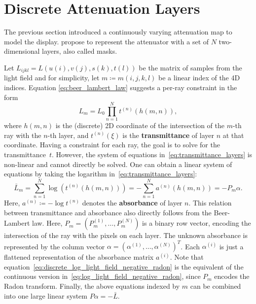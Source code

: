 \section{Discrete Attenuation Layers}

The previous section introduced a continuously varying attenuation map to model the display.
\cite{WetzsteinTomo} propose to represent the attenuator with a set of $N$ two-dimensional layers, also called masks.

Let $L_{ijkl} = L(u(i), v(j), s(k), t(l))$ be the matrix of samples from the light field and for simplicity, let $m \coloneqq m(i, j, k, l)$ be a linear index of the 4D indices.
Equation \ref{eq:beer_lambert_law} suggests a per-ray constraint in the form
\begin{equation}\label{eq:transmittance_layers}
	L_m = L_0 \prod_{n=1}^{N} t^{(n)} (h(m, n)), 
\end{equation}
where $h(m, n)$ is the (discrete) 2D coordinate of the intersection of the \mbox{$m$-th} ray with the \mbox{$n$-th} layer, and $t^{(n)}(\xi)$ is the \textbf{transmittance} of layer $n$ at that coordinate.
Having a constraint for each ray, the goal is to solve for the transmittance~$t$.
However, the system of equations in~\ref{eq:transmittance_layers} is non-linear and cannot directly be solved.
One can obtain a linear system of equations by taking the logarithm in~\ref{eq:transmittance_layers}:
\begin{equation}\label{eq:discrete_log_light_field_negative_radon}
	\bar{L}_m 	=	\sum_{n = 1}^{N}
					\log \left( t^{(n)} (h(m, n)) \right) 
				= 	-\sum_{n = 1}^{N} a^{(n)} (h(m, n)) 
				= 	-P_m \alpha.
\end{equation}
Here, $a^{(n)} \coloneqq -\log t^{(n)}$ denotes the \textbf{absorbance} of layer $n$. 
This relation between transmittance and absorbance also directly follows from the Beer-Lambert law.
Here, $P_m = \left( P_m^{(1)}, \dots, P_m^{(N)} \right)$ is a binary row vector, encoding the intersection of the ray with the pixels on each layer.
The unknown absorbance is represented by the column vector $\alpha = \left( \alpha^{(1)}, \dots, \alpha^{(N)} \right)^T$.
Each $\alpha^{(i)}$ is just a flattened representation of the absorbance matrix $a^{(i)}$.
Note that equation~\ref{eq:discrete_log_light_field_negative_radon} is the equivalent of the continuous version in~\ref{eq:log_light_field_negative_radon}, since $P_m$ encodes the Radon transform.
Finally, the above equations indexed by $m$ can be combined into one large linear system $P \alpha = -\bar{L}$.

